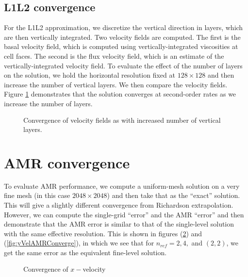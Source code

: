 \documentclass[12pt]{article}
\begin{document}
\subsection{L1L2 convergence}
For the L1L2 approximation, we discretize the vertical direction in layers,
which are then vertically integrated. Two velocity fields are computed. The
first is the basal velocity field, which is computed using
vertically-integrated viscosities at cell faces. The second is the flux
velocity field, which is an estimate of the vertically-integrated velocity
field. To evaluate the effect of the number of layers on the solution, we hold
the horizontal resolution fixed at $128 \times 128$ and then increase the
number of vertical layers. We then compare the velocity fields. Figure
\ref{fig:layersConverge} demonstrates that the solution converges at
second-order rates as we increase the number of layers.

\begin{figure}
\centering
{}

\caption{Convergence of velocity fields as with increased number of vertical layers.}
\label{fig:layersConverge}
\end{figure}

\section{AMR convergence}
To evaluate AMR performance, we compute a uniform-mesh solution on a very fine mesh (in this case $2048 \times 2048$) and then take that as the ``exact'' solution. This will give a slightly different convergence from Richardson extrapolation. However, we can compute the single-grid ``error'' and the AMR ``error'' and then demonstrate that the AMR error is similar to that of the single-level solution with the same effective resolution. This is shown in figures (\ref{fig:xVelAMRConverge}) and (\ref{fig:yVelAMRConverge}), in which we see that for $n_{ref}=2,4,$ and $(2,2)$, we get the same error as the equivalent fine-level solution. 


\begin{figure}
\centering
{}

\caption{Convergence of $x-$velocity}
\label{fig:xVelAMRConverge}
\end{figure}
\end{document}
